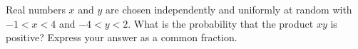 Real numbers $x$ and $y$ are chosen independently and uniformly at random with $-1<x<4$ and $-4<y<2$. What is the probability that the product $xy$ is positive? Express your answer as a common fraction.
